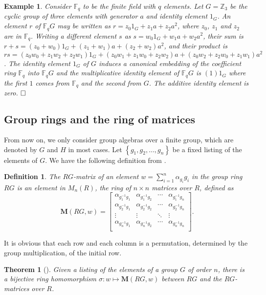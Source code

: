 \documentclass[journal,draftclsnofoot,onecolumn,12pt,twoside]{IEEEtran}
\newtheorem{Definition}{Definition}
\newtheorem{Example}{Example}
\newtheorem{theorem}{Theorem}
\begin{document}
\begin{Example}
Consider $\mathbb{F}_q$ to be the finite field with $q$ elements.  Let $G = \mathbb{Z}_3$ be the cyclic group of three elements with generator $a$ and identity element $1_G$. An element $r$ of $\mathbb{F}_qG$ may be written as $r = z_0 1_G+ z_1a + z_2a^2$, where $z_0$, $z_1$ and $z_2$ are in $\mathbb{F}_q$. Writing a different element $s$ as $s=w_{0}1_{G}+w_{1}a+w_{2}a^{2}$, their sum is
$r+s=(z_{0}+w_{0})1_{G}+(z_{1}+w_{1})a+(z_{2}+w_{2})a^{2}$, and their product is
$rs=(z_{0}w_{0}+z_{1}w_{2}+z_{2}w_{1})1_{G}+(z_{0}w_{1}+z_{1}w_{0}+z_{2}w_{2})a+(z_{0}w_{2}+z_{2}w_{0}+z_{1}w_{1})a^{2}$. The identity element $1_G$ of $G$ induces a canonical embedding of the coefficient ring $\mathbb{F}_q$ into $\mathbb{F}_qG$ and the multiplicative identity element of $\mathbb{F}_qG$ is $(1)1_G$ where the first $1$ comes from $\mathbb{F}_q$ and the second from $G$. The additive identity element is  zero.
$\hfill \square$\end{Example}
\subsection{Group rings and the ring of matrices}
From now on, we only consider group algebras over a finite group, which are denoted by $G$ and $H$ in most cases. Let $\left\{g_1,g_2 ,\ldots ,g_n \right\}$ be a fixed listing of the elements of $G$. We have the following definition from \cite{2}.
\begin{Definition}
The $RG$-matrix of an element $w=\sum_{i=1}^n \alpha_{g_i}g_i$ in the group ring $RG$ is an element in $M_n(R)$, the ring of $n \times n$ matrices over $R$,  defined as
\begin{equation}\label{eq1}
   \mathbf{M}(RG,w)= \left[
      \begin{array}{cccc}
        \alpha_{g_1^{-1}g_1} & \alpha_{g_1^{-1}g_2} & \cdots & \alpha_{g_1^{-1}g_n} \\
        \alpha_{g_2^{-1}g_1} & \alpha_{g_2^{-1}g_2} & \cdots & \alpha_{g_2^{-1}g_n} \\
        \vdots & \vdots & \ddots & \vdots \\
        \alpha_{g_n^{-1}g_1} & \alpha_{g_n^{-1}g_2} & \cdots & \alpha_{g_n^{-1}g_n} \\
      \end{array}
    \right].
\end{equation}
\end{Definition}
It is obvious that each row and each column is a permutation, determined by the group multiplication, of the initial row.
\begin{theorem}[\emph{\cite[Theorem 1]{1}}]
Given a listing of the elements of a group $G$ of order $n$, there is a bijective
ring homomorphism $\sigma :w \mapsto \mathbf{M}(RG,w)$ between $RG$ and the $RG$-matrices
over $R$.
\end{theorem}
\end{document}

